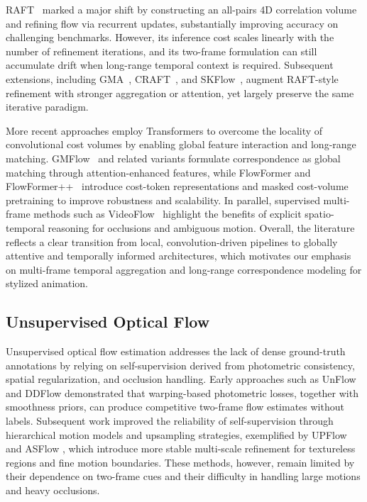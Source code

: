 RAFT~\cite{raft} marked a major shift by constructing an all-pairs 4D correlation
volume and refining flow via recurrent updates, substantially improving accuracy on
challenging benchmarks. However, its inference cost scales linearly with the number
of refinement iterations, and its two-frame formulation can still accumulate drift
when long-range temporal context is required. Subsequent extensions, including
GMA~\cite{gma}, CRAFT~\cite{craft}, and SKFlow~\cite{skflow}, augment RAFT-style
refinement with stronger aggregation or attention, yet largely preserve the same
iterative paradigm.

More recent approaches employ Transformers to overcome the locality of convolutional
cost volumes by enabling global feature interaction and long-range matching. GMFlow~\cite{gmflow}
and related variants formulate correspondence as global matching through attention-enhanced
features, while FlowFormer and FlowFormer++~\cite{flowformer,flowformerpp} introduce
cost-token representations and masked cost-volume pretraining to improve robustness
and scalability. In parallel, supervised multi-frame methods such as VideoFlow~\cite{videoflow2023}
highlight the benefits of explicit spatio-temporal reasoning for occlusions and ambiguous
motion. Overall, the literature reflects a clear transition from local, convolution-driven
pipelines to globally attentive and temporally informed architectures, which motivates our
emphasis on multi-frame temporal aggregation and long-range correspondence modeling for
stylized animation.


\subsection{Unsupervised Optical Flow}
Unsupervised optical flow estimation addresses the lack of dense ground-truth annotations by relying on self-supervision derived from photometric consistency, spatial regularization, and occlusion handling. Early approaches such as UnFlow \cite{upflow} and DDFlow \cite{ddflow} demonstrated that warping-based photometric losses, together with smoothness priors, can produce competitive two-frame flow estimates without labels. Subsequent work improved the reliability of self-supervision through hierarchical motion models and upsampling strategies, exemplified by UPFlow \cite{upflow} and ASFlow \cite{asflow}, which introduce more stable multi-scale refinement for textureless regions and fine motion boundaries. These methods, however, remain limited by their dependence on two-frame cues and their difficulty in handling large motions and heavy occlusions.

